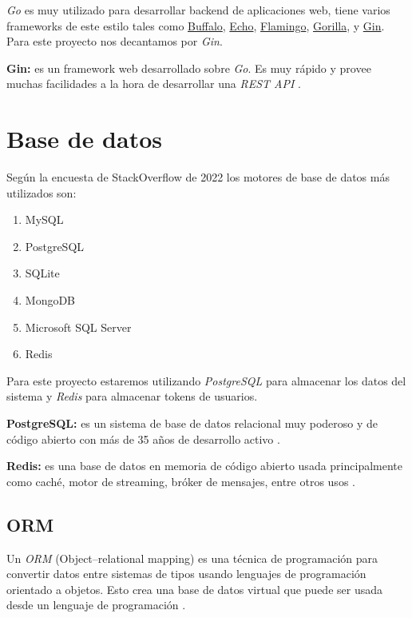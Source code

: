 \textit{Go} es muy utilizado para desarrollar backend de aplicaciones web, tiene varios frameworks de este estilo tales como \href{https://gobuffalo.io/en/}{Buffalo}, \href{https://echo.labstack.com/}{Echo}, \href{https://www.flamingo.me/}{Flamingo}, \href{http://www.gorillatoolkit.org/}{Gorilla}, y \href{https://gin-gonic.com/}{Gin}. Para este proyecto nos decantamos por \textit{Gin}.
\newline

\textbf{Gin:} es un framework web desarrollado sobre \textit{Go}. Es muy rápido y provee muchas facilidades a la hora de desarrollar una \textit{REST API} \cite{gin}.

\section{Base de datos}
Según la encuesta de StackOverflow de 2022 \cite{encuesta2022} los motores de base de datos más utilizados son:
\begin{enumerate}
	\item MySQL
	\item PostgreSQL
	\item SQLite
	\item MongoDB
	\item Microsoft SQL Server
	\item Redis
\end{enumerate}

Para este proyecto estaremos utilizando \textit{PostgreSQL} para almacenar los datos del sistema y \textit{Redis} para almacenar tokens de usuarios.
\newline

\textbf{PostgreSQL:} es un sistema de base de datos relacional muy poderoso y de código abierto con más de 35 años de desarrollo activo \cite{postgres}.
\newline

\textbf{Redis:} es una base de datos en memoria de código abierto usada principalmente como caché, motor de streaming, bróker de mensajes, entre otros usos \cite{redis}.

\subsection{ORM}
Un \textit{ORM} (Object–relational mapping) es una técnica de programación para convertir datos entre sistemas de tipos usando lenguajes de programación orientado a objetos. Esto crea una base de datos virtual que puede ser usada desde un lenguaje de programación \cite{orm}.
\newline

